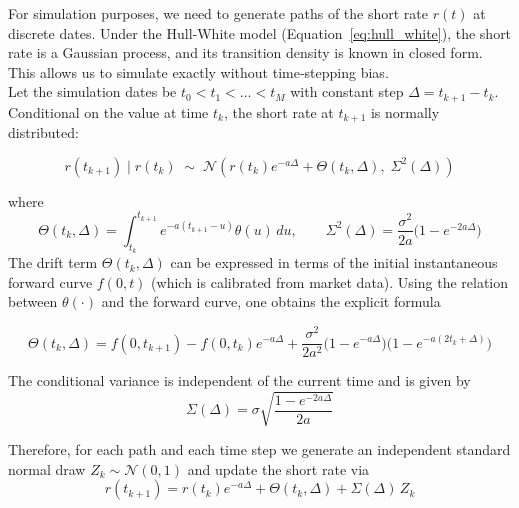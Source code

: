     \noindent 
    For simulation purposes, we need to generate paths of the short rate \(r(t)\) at discrete dates. Under the Hull‑White model (Equation~\ref{eq:hull_white}), the short rate is a Gaussian process, and its transition density is known in closed form.  This allows us to simulate exactly without time‑stepping bias. \\

    
    \noindent
    Let the simulation dates be \(t_0 < t_1 < \dots < t_M\) with constant step \(\Delta = t_{k+1} - t_k\).  Conditional on the value at time \(t_k\), the short rate at \(t_{k+1}\) is normally distributed:

    \begin{equation}
        r(t_{k+1}) \mid r(t_k) \;\sim\; \mathcal{N}\!\left( r(t_k)e^{-a\Delta} + \Theta(t_k,\Delta),\; \Sigma^2(\Delta) \right)
    \end{equation}
        
    where
    \begin{equation}
            \Theta(t_k,\Delta) = \int_{t_k}^{t_{k+1}} e^{-a(t_{k+1}-u)}\theta(u)\,du, \qquad \Sigma^2(\Delta) = \frac{\sigma^2}{2a}\bigl(1-e^{-2a\Delta}\bigr)
    \end{equation}
    \noindent
    The drift term \(\Theta(t_k,\Delta)\) can be expressed in terms of the initial instantaneous forward curve \(f(0,t)\) (which is calibrated from market data).  Using the relation between \(\theta(\cdot)\) and the forward curve, one obtains the explicit formula

    \begin{equation}
            \Theta(t_k,\Delta) = f(0,t_{k+1}) - f(0,t_k)e^{-a\Delta} + \frac{\sigma^2}{2a^2}\bigl(1-e^{-a\Delta}\bigr)\bigl(1-e^{-a(2t_k+\Delta)}\bigr)
    \end{equation}
    
    \noindent
    The conditional variance is independent of the current time and is given by
    \begin{equation}
        \Sigma(\Delta) = \sigma\sqrt{\frac{1-e^{-2a\Delta}}{2a}}
    \end{equation}

    \noindent
    Therefore, for each path and each time step we generate an independent standard normal draw \(Z_{k} \sim \mathcal{N}(0,1)\) and update the short rate via
    \begin{equation}
         r(t_{k+1}) = r(t_k)e^{-a\Delta} + \Theta(t_k,\Delta) + \Sigma(\Delta)\,Z_{k}
    \end{equation}
    
